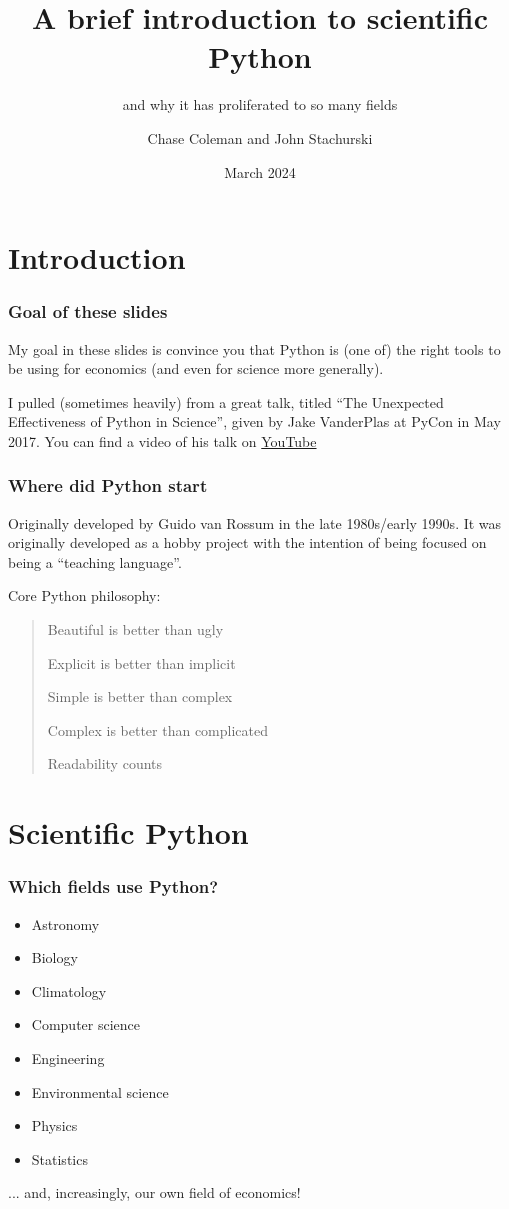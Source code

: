 \documentclass[
    xcolor={svgnames,dvipsnames},
    hyperref={colorlinks, citecolor=DeepPink4, linkcolor=DarkRed, urlcolor=DarkBlue}
]{beamer}  %
\title{A brief introduction to scientific Python}
\subtitle{and why it has proliferated to so many fields}
\author{Chase Coleman and John Stachurski}
\date{March 2024}
\newcommand{\1}{\mathbbm 1}
\begin{document}
\begin{frame}
  \titlepage
\end{frame}

\section{Introduction}
\begin{frame}
    \frametitle{Goal of these slides}

    My goal in these slides is convince you that Python is (one of) the right tools to be using
    for economics (and even for science more generally).

    I pulled (sometimes heavily) from a great talk, titled ``The Unexpected Effectiveness of
    Python in Science'', given by Jake VanderPlas at PyCon in May 2017. You can find a video of
    his talk on \href{https://youtu.be/ZyjCqQEUa8o?si=EeF1CUmf5SnbvUuj}{YouTube}

\end{frame}

\begin{frame}
    \frametitle{Where did Python start}

    Originally developed by Guido van Rossum in the late 1980s/early 1990s. It was originally
    developed as a hobby project with the intention of being focused on being a ``teaching
    language''.

    Core Python philosophy:

    \vspace{0.25cm}
    \begin{quote}
        Beautiful is better than ugly

        Explicit is better than implicit

        Simple is better than complex

        Complex is better than complicated

        Readability counts
    \end{quote}

\end{frame}

\section{Scientific Python}
\begin{frame}
    \frametitle{Which fields use Python?}

    \begin{itemize}
        \item Astronomy
        \item Biology
        \item Climatology
        \item Computer science
        \item Engineering
        \item Environmental science
        \item Physics
        \item Statistics
    \end{itemize}

    ... and, increasingly, our own field of economics!

\end{frame}
\end{document}
